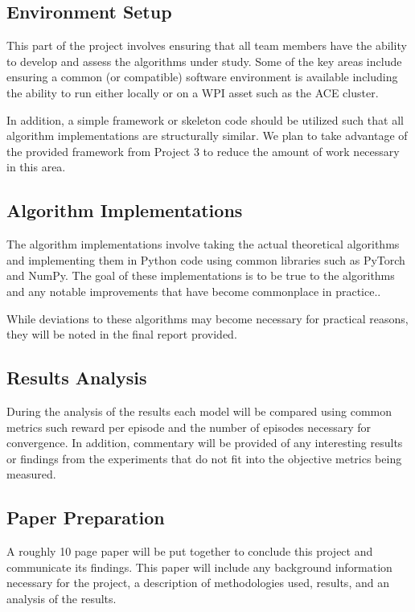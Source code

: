 \documentclass[conference]{IEEEtran}
\begin{document}
\subsection{Environment Setup}
This part of the project involves ensuring that all team members have the ability to develop and assess the algorithms under study.
Some of the key areas include ensuring a common (or compatible) software environment is available including the ability to run \cite{bhonker2017playing} either locally or on a WPI asset such as the ACE cluster.

In addition, a simple framework or skeleton code should be utilized such that all algorithm implementations are structurally similar.
We plan to take advantage of the provided framework from Project 3 to reduce the amount of work necessary in this area.

\subsection{Algorithm Implementations}
The algorithm implementations involve taking the actual theoretical algorithms and implementing them in Python code using common libraries such as PyTorch and NumPy.
The goal of these implementations is to be true to the algorithms and any notable improvements that have become commonplace in practice..

While deviations to these algorithms may become necessary for practical reasons, they will be noted in the final report provided.

\subsection{Results Analysis}
During the analysis of the results each model will be compared using common metrics such reward per episode and the number of episodes necessary for convergence.
In addition, commentary will be provided of any interesting results or findings from the experiments that do not fit into the objective metrics being measured.

\subsection{Paper Preparation}
A roughly 10 page paper will be put together to conclude this project and communicate its findings.
This paper will include any background information necessary for the project, a description of methodologies used, results, and an analysis of the results.
\end{document}
